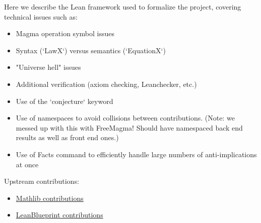 
Here we describe the Lean framework used to formalize the project, covering technical issues such as:

\begin{itemize}
    \item Magma operation symbol issues
    \item Syntax (`LawX`) versus semantics (`EquationX`)
    \item "Universe hell" issues
    \item Additional verification (axiom checking, Leanchecker, etc.)
    \item Use of the `conjecture` keyword
    \item Use of namespaces to avoid collisions between contributions. (Note: we messed up with this with FreeMagma! Should have namespaced back end results as well as front end ones.)
    \item Use of Facts command to efficiently handle large numbers of anti-implications at once
\end{itemize}

Upstream contributions:

\begin{itemize}
    \item \href{https://github.com/leanprover-community/mathlib4/pulls?q=is%3Apr+is%3Abody+EquationalTheories+}{Mathlib contributions}
    \item \href{https://github.com/PatrickMassot/leanblueprint/pulls?q=is%3Apr+in%3Abody+EquationalTheories+}{LeanBlueprint contributions}
\end{itemize}
